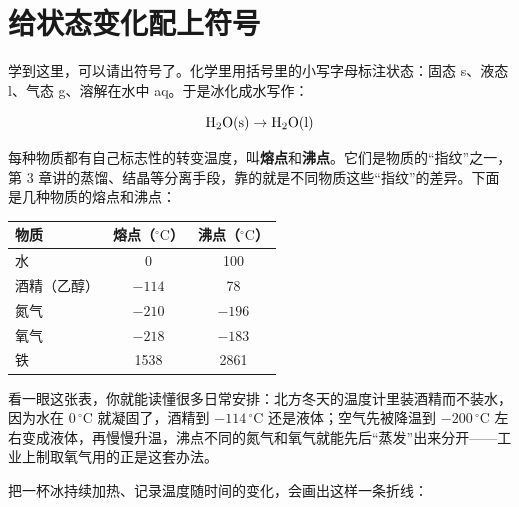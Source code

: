 \section{给状态变化配上符号}

学到这里，可以请出符号了。化学里用括号里的小写字母标注状态：固态 s、液态 l、气态 g、溶解在水中 aq。于是冰化成水写作：

\[\mathrm{H_2O(s)} \rightarrow \mathrm{H_2O(l)}\]

每种物质都有自己标志性的转变温度，叫\textbf{熔点}和\textbf{沸点}。它们是物质的“指纹”之一，第 3 章讲的蒸馏、结晶等分离手段，靠的就是不同物质这些“指纹”的差异。下面是几种物质的熔点和沸点：

\begin{table}[htbp]
\centering
\begin{tabular}{lcc}
\toprule
物质 & 熔点（$^{\circ}\mathrm{C}$） & 沸点（$^{\circ}\mathrm{C}$） \\
\midrule
水 & 0 & 100 \\
酒精（乙醇） & $-114$ & 78 \\
氮气 & $-210$ & $-196$ \\
氧气 & $-218$ & $-183$ \\
铁 & 1538 & 2861 \\
\bottomrule
\end{tabular}
\end{table}

看一眼这张表，你就能读懂很多日常安排：北方冬天的温度计里装酒精而不装水，因为水在 $0\,^{\circ}\mathrm{C}$ 就凝固了，酒精到 $-114\,^{\circ}\mathrm{C}$ 还是液体；空气先被降温到 $-200\,^{\circ}\mathrm{C}$ 左右变成液体，再慢慢升温，沸点不同的氮气和氧气就能先后“蒸发”出来分开——工业上制取氧气用的正是这套办法。

把一杯冰持续加热、记录温度随时间的变化，会画出这样一条折线：

\begin{center}
\end{center}

